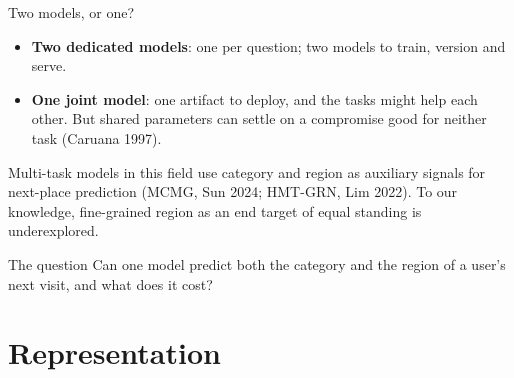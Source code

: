 \documentclass{beamer}
\newcommand{\scite}[1]{{\color{black!60}\footnotesize(#1)}}
\begin{document}
\begin{frame}{Two models, or one?}
    \vspace{0pt}%
    \begin{itemize}\setlength{\itemsep}{1.2ex}
        \item \textbf{Two dedicated models}: one per question; two models to train, version and serve.
        \item \textbf{One joint model}: one artifact to deploy, and the tasks might help each other.
              \alert{But shared parameters can settle on a compromise good for neither task}
              \scite{Caruana 1997}.
    \end{itemize}

    \smallskip
    {\footnotesize Multi-task models in this field use category and region as auxiliary signals for
    next-place prediction \scite{MCMG, Sun 2024; HMT-GRN, Lim 2022}. To our knowledge, fine-grained
    region as an end target of equal standing is underexplored.\par}

    \smallskip
    \begin{alertblock}{The question}
        \centering
        Can one model predict both the category and the region of a user's next visit,
        and what does it cost?\par
    \end{alertblock}
\end{frame}

\section{Representation}
\end{document}
